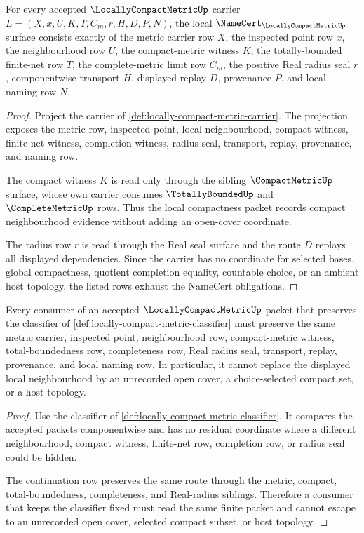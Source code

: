 \begin{theorem}
\label{thm:locally-compact-metric-namecert-obligations}
For every accepted $\LocallyCompactMetricUp$ carrier $L=(X,x,U,K,T,C_m,r,H,D,P,N)$, the local $\NameCert_{\LocallyCompactMetricUp}$ surface consists exactly of the metric carrier row $X$, the inspected point row $x$, the neighbourhood row $U$, the compact-metric witness $K$, the totally-bounded finite-net row $T$, the complete-metric limit row $C_m$, the positive Real radius seal $r$, componentwise transport $H$, displayed replay $D$, provenance $P$, and local naming row $N$.
\end{theorem}
\begin{proof}
Project the carrier of \autoref{def:locally-compact-metric-carrier}. The projection exposes the metric row, inspected point, local neighbourhood, compact witness, finite-net witness, completion witness, radius seal, transport, replay, provenance, and naming row.

The compact witness $K$ is read only through the sibling $\CompactMetricUp$ surface, whose own carrier consumes $\TotallyBoundedUp$ and $\CompleteMetricUp$ rows. Thus the local compactness packet records compact neighbourhood evidence without adding an open-cover coordinate.

The radius row $r$ is read through the Real seal surface and the route $D$ replays all displayed dependencies. Since the carrier has no coordinate for selected bases, global compactness, quotient completion equality, countable choice, or an ambient host topology, the listed rows exhaust the NameCert obligations.
\end{proof}

\begin{theorem}
\label{thm:locally-compact-metric-neighbourhood-nonescape}
Every consumer of an accepted $\LocallyCompactMetricUp$ packet that preserves the classifier of \autoref{def:locally-compact-metric-classifier} must preserve the same metric carrier, inspected point, neighbourhood row, compact-metric witness, total-boundedness row, completeness row, Real radius seal, transport, replay, provenance, and local naming row. In particular, it cannot replace the displayed local neighbourhood by an unrecorded open cover, a choice-selected compact set, or a host topology.
\end{theorem}
\begin{proof}
Use the classifier of \autoref{def:locally-compact-metric-classifier}. It compares the accepted packets componentwise and has no residual coordinate where a different neighbourhood, compact witness, finite-net row, completion row, or radius seal could be hidden.

The continuation row preserves the same route through the metric, compact, total-boundedness, completeness, and Real-radius siblings. Therefore a consumer that keeps the classifier fixed must read the same finite packet and cannot escape to an unrecorded open cover, selected compact subset, or host topology.
\end{proof}

